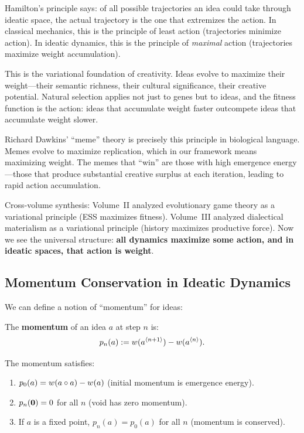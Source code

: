 \begin{interpretation}
Hamilton's principle says: of all possible trajectories an idea could take
through ideatic space, the actual trajectory is the one that extremizes the
action. In classical mechanics, this is the principle of least action
(trajectories minimize action). In ideatic dynamics, this is the principle of
\emph{maximal} action (trajectories maximize weight accumulation).

This is the variational foundation of creativity. Ideas evolve to maximize
their weight---their semantic richness, their cultural significance, their
creative potential. Natural selection applies not just to genes but to ideas,
and the fitness function is the action: ideas that accumulate weight faster
outcompete ideas that accumulate weight slower.

Richard Dawkins' ``meme'' theory is precisely this principle in biological
language. Memes evolve to maximize replication, which in our framework means
maximizing weight. The memes that ``win'' are those with high emergence
energy---those that produce substantial creative surplus at each iteration,
leading to rapid action accumulation.

Cross-volume synthesis: Volume~II analyzed evolutionary game theory as a
variational principle (ESS maximizes fitness). Volume~III analyzed dialectical
materialism as a variational principle (history maximizes productive force).
Now we see the universal structure: \textbf{all dynamics maximize some action,
and in ideatic spaces, that action is weight}.
\end{interpretation}

\subsection{Momentum Conservation in Ideatic Dynamics}

We can define a notion of ``momentum'' for ideas:

\begin{definition}
\label{def:momentum}
The \textbf{momentum} of an idea $a$ at step $n$ is:
\[
  p_n(a) := w(a^{\langle n+1 \rangle}) - w(a^{\langle n \rangle}).
\]
\end{definition}

\begin{theorem}
\label{thm:momentum}
The momentum satisfies:
\begin{enumerate}
  \item $p_0(a) = w(a \circ a) - w(a)$ (initial momentum is emergence energy).
  \item $p_n(\mathbf{0}) = 0$ for all $n$ (void has zero momentum).
  \item If $a$ is a fixed point, $p_n(a) = p_0(a)$ for all $n$ (momentum is conserved).
\end{enumerate}
\end{theorem}

